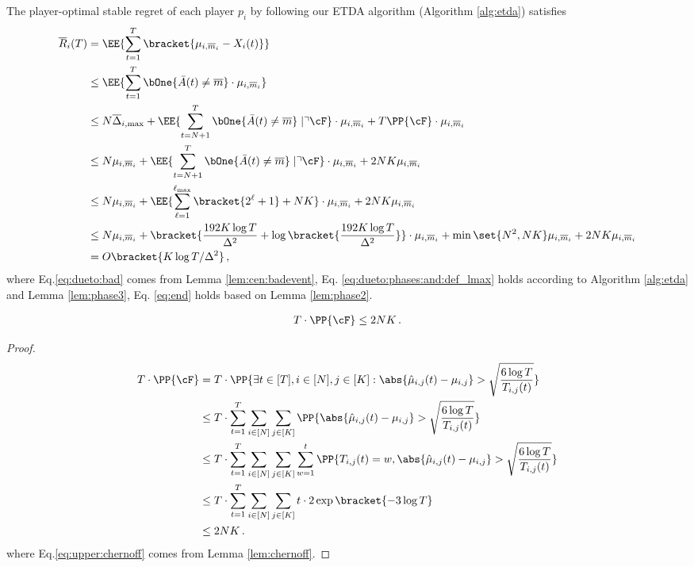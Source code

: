The player-optimal stable regret of each player $p_i$ by following our ETDA algorithm (Algorithm \ref{alg:etda}) satisfies
\begin{align}
    \overline{R}_i(T) &=\EE{\sum_{t=1}^T \bracket{\mu_{i,\overline{m}_i} - X_{i}(t)} } \notag \\
    &\le \EE{\sum_{t=1}^T \bOne{\bar{A}(t) \neq \overline{m}} \cdot \mu_{i,\overline{m}_i}} \notag \\
    &\le N \overline{\Delta}_{i,\max}+ \EE{\sum_{t=N+1}^T \bOne{\bar{A}(t) \neq \overline{m}} \mid  \urcorner \cF }\cdot \mu_{i,\overline{m}_i} + T\PP{\cF }\cdot \mu_{i,\overline{m}_i} \notag \\
    &\le N \mu_{i,\overline{m}_i}+ \EE{\sum_{t=N+1}^T \bOne{\bar{A}(t) \neq \overline{m}}\mid \urcorner \cF }\cdot \mu_{i,\overline{m}_i}  + 2NK\mu_{i,\overline{m}_i} \label{eq:dueto:bad} \\
    &\le N \mu_{i,\overline{m}_i}+\EE{ \sum_{\ell=1}^{\ell_{\max}  }\bracket{2^{\ell} +1} +NK }\cdot \mu_{i,\overline{m}_i} + 2NK\mu_{i,\overline{m}_i} \label{eq:dueto:phases:and:def_lmax}\\
    &\le {N \mu_{i,\overline{m}_i}}+  {\bracket{ \frac{192K\log T}{\Delta^2} + \log\bracket{ \frac{192K\log T}{\Delta^2}} }\cdot \mu_{i,\overline{m}_i}} +{\min\set{N^2, NK}\mu_{i,\overline{m}_i}} + {2NK\mu_{i,\overline{m}_i}} \label{eq:end} \\
    &= O\bracket{K\log T/\Delta^2} \notag \,,
\end{align}
where Eq.\eqref{eq:dueto:bad} comes from Lemma \ref{lem:cen:badevent}, Eq. \eqref{eq:dueto:phases:and:def_lmax} holds according to Algorithm \ref{alg:etda} and Lemma \ref{lem:phase3}, Eq. \eqref{eq:end} holds based on Lemma \ref{lem:phase2}.~\\ 
\newline

\begin{lemma}\label{lem:cen:badevent}
\begin{align*}
T\cdot \PP{\cF}  \le 2NK \,.
\end{align*}
\end{lemma}

\begin{proof}
\begin{align}
T\cdot \PP{\cF} &= T\cdot \PP{ \exists t\in[T], i\in[N],j\in[K]: \abs{\hat{\mu}_{i,j}(t)-\mu_{i,j}}>\sqrt{\frac{6\log T}{T_{i,j}(t)}}  } \notag \\
&\le T\cdot \sum_{t=1}^T \sum_{i\in[N]}\sum_{j\in[K]} \PP{ \abs{\hat{\mu}_{i,j}(t)-\mu_{i,j}}>\sqrt{\frac{6\log T}{T_{i,j}(t)}} } \notag\\
&\le T\cdot \sum_{t=1}^T \sum_{i\in[N]}\sum_{j\in[K]} \sum_{w = 1}^{t} \PP{T_{i,j}(t)=w, \abs{\hat{\mu}_{i,j}(t)-\mu_{i,j}}>\sqrt{\frac{6\log T}{T_{i,j}(t)}} } \notag\\ 
&\le T\cdot \sum_{t=1}^T \sum_{i\in[N]}\sum_{j\in[K]} t\cdot 2\exp\bracket{ -3\log T } \label{eq:upper:chernoff}\\ 
&\le 2NK\,. \notag 
\end{align}
where Eq.\eqref{eq:upper:chernoff} comes from Lemma \ref{lem:chernoff}. 
\end{proof}


